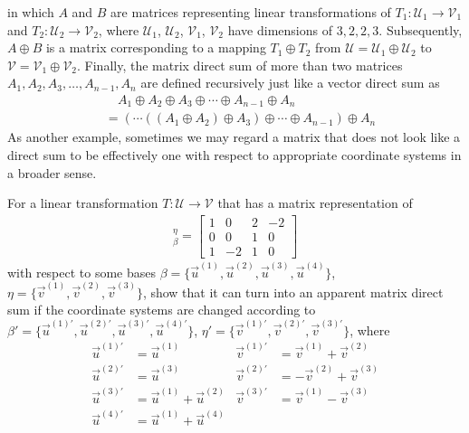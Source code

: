 in which $A$ and $B$ are matrices representing linear transformations of $T_1: \mathcal{U}_1 \to \mathcal{V}_1$ and $T_2: \mathcal{U}_2 \to \mathcal{V}_2$, where $\mathcal{U}_1$, $\mathcal{U}_2$, $\mathcal{V}_1$, $\mathcal{V}_2$ have dimensions of $3,2,2,3$. Subsequently, $A \oplus B$ is a matrix corresponding to a mapping $T_1 \oplus T_2$ from $\mathcal{U} = \mathcal{U}_1 \oplus \mathcal{U}_2$ to $\mathcal{V} = \mathcal{V}_1 \oplus \mathcal{V}_2$. Finally, the matrix direct sum of more than two matrices $A_1, A_2, A_3, \ldots, A_{n-1}, A_n$ are defined recursively just like a vector direct sum as
\begin{align*}
&\quad A_1 \oplus A_2 \oplus A_3 \oplus \cdots \oplus A_{n-1} \oplus A_n \\
&= (\cdots ((A_1 \oplus A_2) \oplus A_3) \oplus \cdots \oplus A_{n-1}) \oplus A_n
\end{align*}
As another example, sometimes we may regard a matrix that does not look like a direct sum to be effectively one with respect to appropriate coordinate systems in a broader sense.
\begin{exmp}
For a linear transformation $T: \mathcal{U} \to \mathcal{V}$ that has a matrix representation of
\begin{align*}
[T]_\beta^\eta =
\begin{bmatrix}
1 & 0 & 2 & -2 \\
0 & 0 & 1 & 0 \\
1 & -2 & 1 & 0
\end{bmatrix} 
\end{align*}
with respect to some bases $\mathcal{\beta} = \{\vec{u}^{(1)}, \vec{u}^{(2)}, \vec{u}^{(3)}, \vec{u}^{(4)}\}$, $\mathcal{\eta} = \{\vec{v}^{(1)}, \vec{v}^{(2)}, \vec{v}^{(3)}\}$, show that it can turn into an apparent matrix direct sum if the coordinate systems are changed according to $\mathcal{\beta}' = \{\vec{u}^{(1)'}, \vec{u}^{(2)'}, \vec{u}^{(3)'}, \vec{u}^{(4)'}\}$, $\mathcal{\eta}' = \{\vec{v}^{(1)'}, \vec{v}^{(2)'}, \vec{v}^{(3)'}\}$, where
\begin{align*}
\vec{u}^{(1)'} &= \vec{u}^{(1)} & \vec{v}^{(1)'} &= \vec{v}^{(1)} + \vec{v}^{(2)} \\
\vec{u}^{(2)'} &= \vec{u}^{(3)} & \vec{v}^{(2)'} &= -\vec{v}^{(2)} + \vec{v}^{(3)} \\
\vec{u}^{(3)'} &= \vec{u}^{(1)} + \vec{u}^{(2)} & \vec{v}^{(3)'} &= \vec{v}^{(1)} - \vec{v}^{(3)} \\
\vec{u}^{(4)'} &= \vec{u}^{(1)} + \vec{u}^{(4)}
\end{align*}
\end{exmp}
